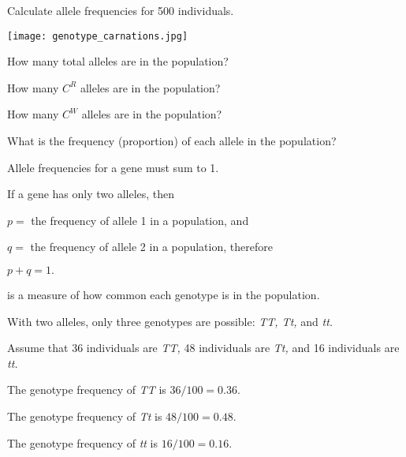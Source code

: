 \documentclass[t]{beamer}
\begin{document}
%

\begin{frame}{Calculate allele frequencies for 500 individuals.}
	\vspace{-1\baselineskip}
	\begin{center}
		\texttt{[image: genotype\_carnations.jpg]}
	\end{center}
	
	\vspace{-\baselineskip}
	\hangpara How many total alleles are in the population?
	\pause
		
	\hangpara How many $C^R$ alleles are in the population?
	\pause

	\hangpara How many $C^W$ alleles are in the population?
	\pause

	\hangpara What is the frequency (proportion) of each allele in the population?
	
\end{frame}

\begin{frame}{Allele frequencies for a gene must sum to 1.}
	
	\hangpara If a gene has only two alleles, then

	\hangpara $p=$ the frequency of allele 1 in a population, and
	\pause
		
	\hangpara $q=$ the frequency of allele 2 in a population, therefore
	\pause

	\hangpara $p+q=1.$ 
	
	\vspace{\baselineskip}
	\hangpara {}
	
\end{frame}
%
\begin{frame}{ is a measure of how common each genotype is in the population.}

	\hangpara With two alleles, only three genotypes are possible: \textit{TT, Tt,} and \textit{tt.}
	
	\hangpara Assume that 36 individuals are \textit{TT,} 48 individuals are \textit{Tt,} and 16 individuals are \textit{tt.}
	
	\hangpara The genotype frequency of \textit{TT} is $36/100 = 0.36.$

	\hangpara The genotype frequency of \textit{Tt} is $48/100 = 0.48.$
	
	\hangpara The genotype frequency of \textit{tt} is $16/100 = 0.16.$

	

\end{frame}
\end{document}
